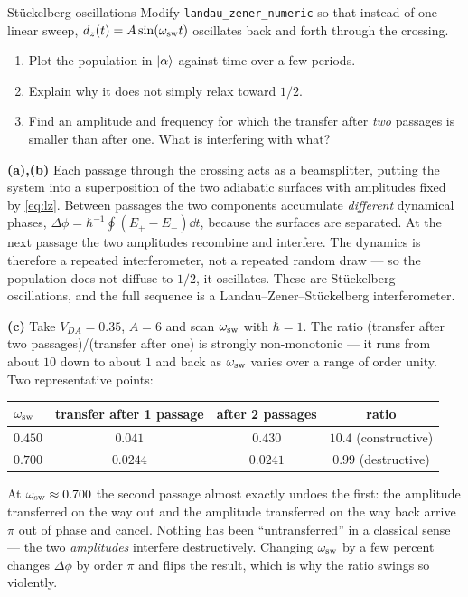 \begin{problem}{St\"uckelberg oscillations}
\label{prob:stuck}
Modify \texttt{landau\_zener\_numeric} so that instead of one linear sweep,
$d_z(t) = A\sin(\omega_{\rm sw}t)$ oscillates back and forth through the crossing.
\begin{enumerate}[label=(\alph*),leftmargin=*,itemsep=1pt]
\item Plot the population in $\ket{\alpha}$ against time over a few periods.
\item Explain why it does not simply relax toward $1/2$.
\item Find an amplitude and frequency for which the transfer after \emph{two} passages
is smaller than after one. What is interfering with what?
\end{enumerate}
\end{problem}

\begin{solution}
\textbf{(a),(b)} Each passage through the crossing acts as a beamsplitter, putting the
system into a superposition of the two adiabatic surfaces with amplitudes fixed by
\cref{eq:lz}. Between passages the two components accumulate \emph{different} dynamical
phases, $\Delta\phi = \hbar^{-1}\!\oint\!\left(E_+-E_-\right)\dd t$, because the surfaces
are separated. At the next passage the two amplitudes recombine and interfere. The
dynamics is therefore a repeated interferometer, not a repeated random draw --- so the
population does not diffuse to $1/2$, it oscillates. These are St\"uckelberg
oscillations, and the full sequence is a Landau--Zener--St\"uckelberg interferometer.

\textbf{(c)} Take $V_{DA}=0.35$, $A=6$ and scan $\omega_{\rm sw}$ with $\hbar=1$. The
ratio (transfer after two passages)/(transfer after one) is strongly non-monotonic ---
it runs from about $10$ down to about $1$ and back as $\omega_{\rm sw}$ varies over a
range of order unity. Two representative points:

\smallskip
\begin{center}\small
\begin{tabular}{@{}lccc@{}}
\toprule
$\omega_{\rm sw}$ & transfer after 1 passage & after 2 passages & ratio \\
\midrule
$0.450$ & $0.041$ & $0.430$ & $10.4$ \quad(constructive) \\
$0.700$ & $0.0244$ & $0.0241$ & $0.99$ \quad(destructive) \\
\bottomrule
\end{tabular}
\end{center}
\smallskip

\noindent
At $\omega_{\rm sw}\approx0.700$ the second passage almost exactly undoes the first: the
amplitude transferred on the way out and the amplitude transferred on the way back
arrive $\pi$ out of phase and cancel. Nothing has been ``untransferred'' in a classical
sense --- the two \emph{amplitudes} interfere destructively. Changing
$\omega_{\rm sw}$ by a few percent changes $\Delta\phi$ by order $\pi$ and flips the
result, which is why the ratio swings so violently.
\end{solution}

